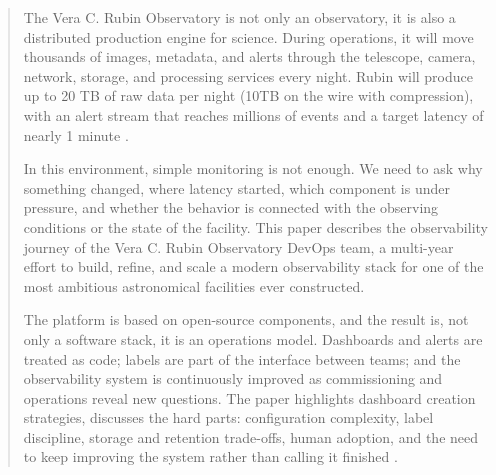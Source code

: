 
\begin{abstract}
The Vera C. Rubin Observatory is not only an observatory, it is also a distributed production engine for science. During operations, it will move thousands of images, metadata, and alerts through the telescope, camera, network, storage, and processing services every night. Rubin will produce up to 20 TB of raw data per night (10TB on the wire with compression), with an alert stream that reaches millions of events and a target latency of nearly 1 minute \cite{2019ApJ...873..111I}.

In this environment, simple monitoring is not enough. We need to ask why something changed, where latency started, which component is under pressure, and whether the behavior is connected with the observing conditions or the state of the facility. This paper describes the observability journey of the Vera C. Rubin Observatory DevOps team, a multi-year effort to build, refine, and scale a modern observability stack for one of the most ambitious astronomical facilities ever constructed.

The platform is based on open-source components, and the result is, not only a software stack, it is an operations model. Dashboards and alerts are treated as code; labels are part of the interface between teams; and the observability system is continuously improved as commissioning and operations reveal new questions. The paper highlights dashboard creation strategies, discusses the hard parts: configuration complexity, label discipline, storage and retention trade-offs, human adoption, and the need to keep improving the system rather than calling it finished \cite{lsst-it-k8s-cookbook}.
\end{abstract}


